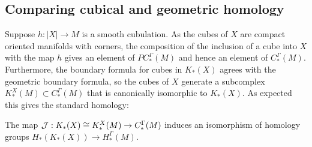 \subsection{Comparing cubical and geometric homology}\label{S: cubical and geometric homology} 

Suppose $h: |X|\to M$ is a smooth cubulation. As the cubes of $X$ are compact oriented manifolds with corners, the composition of the inclusion of a cube into $X$ with the map $h$ gives an element of $PC_*^\Gamma(M)$ and hence an element of $C_*^\Gamma(M)$. Furthermore, the boundary formula for cubes in $K_*(X)$ agrees with the geometric boundary formula, so the cubes of $X$ generate a subcomplex $K^X_*(M)\subset C^\Gamma_*(M)$ that is canonically isomorphic to  $K_*(X)$. As expected this gives the standard homology:

\begin{theorem}\label{T: cubical homology iso}
The map $\mathcal{J}: K_*(X)\cong K^X_*(M)\to C^\Gamma_*(M)$ induces an isomorphism of homology groups $H_*(K_*(X))\to H_*^\Gamma(M)$.
\end{theorem}
